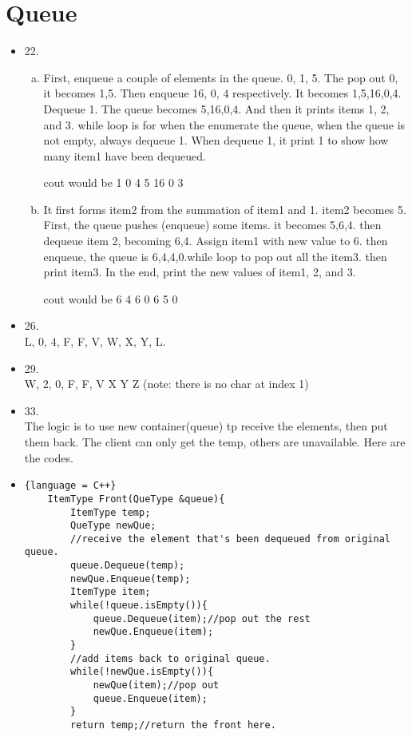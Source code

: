 \documentclass[11pt]{article} %
\begin{document}
\section{Queue}
\begin{itemize}
    \item 22.\\
    \begin{enumerate}[a.]
        \item First, enqueue a couple of elements in the queue. 0, 1, 5. The pop out 0, it becomes 1,5. Then enqueue  16, 0, 4 respectively. It becomes 1,5,16,0,4. Dequeue 1. The queue becomes 5,16,0,4.
        And then it prints items 1, 2, and 3. while loop is for when the enumerate the queue, when the queue is not empty, always dequeue 1. When dequeue 1, it print 1 to show how many item1 have been dequeued.

        cout would be 1 0 4 5 16 0 3

        \item It first forms item2 from the summation of item1 and 1. item2 becomes 5. First, the queue pushes (enqueue) some items. it becomes 5,6,4. then dequeue item 2, becoming 6,4. Assign item1 with new value to 6. then enqueue, the queue is 6,4,4,0.while loop to pop out all the item3. then print item3. 
        In the end, print the new values of item1, 2, and 3.

        cout would be 6 4 6 0 6 5 0
    \end{enumerate}

    \item 26.\\
L, 0, 4, F, F, V, W, X, Y, L.

    \item 29.\\
W, 2, 0, F, F, V  X Y Z (note: there is no char at index 1)


\item 33.\\
The logic is to use new container(queue) tp receive the elements, then put them back. The client can
only get the temp, others are unavailable. Here are the codes.
    \item \begin{lstlisting}{language = C++}
    ItemType Front(QueType &queue){
        ItemType temp;
        QueType newQue;
        //receive the element that's been dequeued from original queue.
        queue.Dequeue(temp);
        newQue.Enqueue(temp);
        ItemType item;
        while(!queue.isEmpty()){
            queue.Dequeue(item);//pop out the rest
            newQue.Enqueue(item);
        }
        //add items back to original queue.
        while(!newQue.isEmpty()){
            newQue(item);//pop out
            queue.Enqueue(item);
        }
        return temp;//return the front here.


\end{lstlisting}
\end{itemize}
\end{document}
